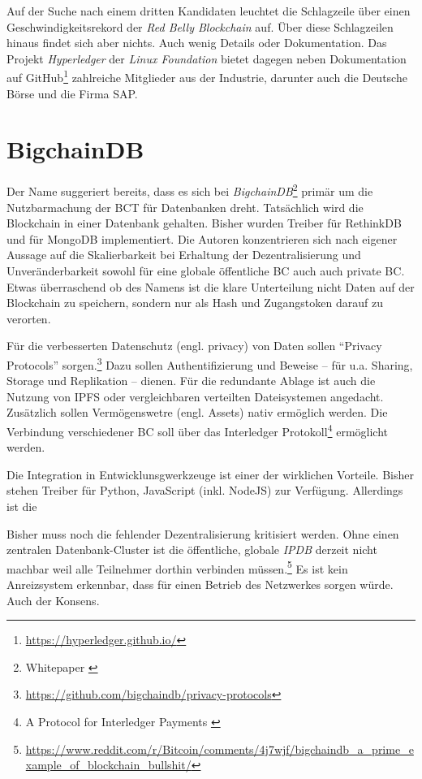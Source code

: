 Auf der Suche nach einem dritten Kandidaten leuchtet die Schlagzeile über einen Geschwindigkeitsrekord der \emph{Red Belly Blockchain} auf. Über diese Schlagzeilen hinaus findet sich aber nichts. Auch wenig Details oder Dokumentation. Das Projekt \emph{Hyperledger} der \emph{Linux Foundation} bietet dagegen neben Dokumentation auf GitHub\footnote{\url{https://hyperledger.github.io/}} zahlreiche Mitglieder aus der Industrie, darunter auch die Deutsche Börse und die Firma SAP.

\section{BigchainDB}

Der Name suggeriert bereits, dass es sich bei \emph{BigchainDB}\footnote{Whitepaper \autocite{p:bigchaindb}} primär um die Nutzbarmachung der \gls{BCT} für Datenbanken dreht. Tatsächlich wird die Blockchain in einer Datenbank gehalten. Bisher wurden Treiber für RethinkDB und für MongoDB implementiert. Die Autoren konzentrieren sich nach eigener Aussage auf die Skalierbarkeit bei Erhaltung der Dezentralisierung und Unveränderbarkeit sowohl für eine globale öffentliche \gls{BC} auch auch private \gls{BC}.
Etwas überraschend ob des Namens ist die klare Unterteilung nicht Daten auf der Blockchain zu speichern, sondern nur als Hash und Zugangstoken darauf zu verorten.

Für die verbesserten Datenschutz (engl. privacy) von Daten sollen \enquote{Privacy Protocols} sorgen.\footnote{\url{https://github.com/bigchaindb/privacy-protocols}} Dazu sollen Authentifizierung und Beweise -- für u.a. Sharing, Storage und Replikation -- dienen.
Für die redundante Ablage ist auch die Nutzung von \gls{IPFS} oder vergleichbaren verteilten Dateisystemen angedacht.
Zusätzlich sollen Vermögenswetre (engl. Assets) nativ ermöglich werden. Die Verbindung verschiedener \gls{BC} soll über das Interledger Protokoll\footnote{A Protocol for Interledger Payments \autocite{p:interledger}}\label{first:interledger} ermöglicht werden.

Die Integration in Entwicklunsgwerkzeuge ist einer der wirklichen Vorteile. Bisher stehen Treiber für Python, JavaScript (inkl. NodeJS) zur Verfügung.
Allerdings ist die 

Bisher muss noch die fehlender Dezentralisierung kritisiert werden. Ohne einen zentralen Datenbank-Cluster ist die öffentliche, globale \emph{IPDB} derzeit nicht machbar weil alle Teilnehmer dorthin verbinden müssen.\footnote{\url{https://www.reddit.com/r/Bitcoin/comments/4j7wjf/bigchaindb_a_prime_example_of_blockchain_bullshit/}} Es ist kein Anreizsystem erkennbar, dass für einen Betrieb des Netzwerkes sorgen würde.
Auch der Konsens.


